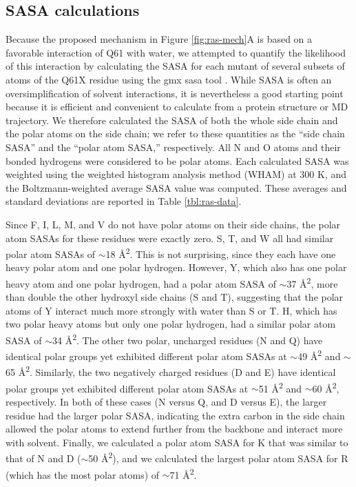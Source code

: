 \subsection{SASA calculations}

Because the proposed mechanism in Figure \ref{fig:ras-mech}A is based on a favorable interaction of Q61 with water, we attempted to quantify the likelihood of this interaction by calculating the SASA for each mutant of several subsets of atoms of the Q61X residue using the gmx sasa tool \cite{Eisenhaber1995}.
While SASA is often an oversimplification of solvent interactions, it is nevertheless a good starting point because it is efficient and convenient to calculate from a protein structure or MD trajectory. 
We therefore calculated the SASA of both the whole side chain and the polar atoms on the side chain; we refer to these quantities as the ``side chain SASA'' and the ``polar atom SASA,'' respectively. 
All N and O atoms and their bonded hydrogens were considered to be polar atoms. 
Each calculated SASA was weighted using the weighted histogram analysis method (WHAM) at 300 K, and the Boltzmann-weighted average SASA value was computed. 
These averages and standard deviations are reported in Table \ref{tbl:ras-data}.

Since F, I, L, M, and V do not have polar atoms on their side chains, the polar atom SASAs for these residues were exactly zero. 
S, T, and W all had similar polar atom SASAs of $\sim$18 \si{\angstrom^2}. 
This is not surprising, since they each have one heavy polar atom and one polar hydrogen. 
However, Y, which also has one polar heavy atom and one polar hydrogen, had a polar atom SASA of $\sim$37 \si{\angstrom^2}, more than double the other hydroxyl side chains (S and T), suggesting that the polar atoms of Y interact much more strongly with water than S or T. 
H, which has two polar heavy atoms but only one polar hydrogen, had a similar polar atom SASA of $\sim$34 \si{\angstrom^2}. 
The other two polar, uncharged residues (N and Q) have identical polar groups yet exhibited different polar atom SASAs at $\sim$49 \si{\angstrom^2} and $\sim$65 \si{\angstrom^2}. 
Similarly, the two negatively charged residues (D and E) have identical polar groups yet exhibited different polar atom SASAs at $\sim$51 \si{\angstrom^2} and $\sim$60 \si{\angstrom^2}, respectively. 
In both of these cases (N versus Q, and D versus E), the larger residue had the larger polar SASA, indicating the extra carbon in the side chain allowed the polar atoms to extend further from the backbone and interact more with solvent. 
Finally, we calculated a polar atom SASA for K that was similar to that of N and D ($\sim$50 \si{\angstrom^2}), and we calculated the largest polar atom SASA for R (which has the most polar atoms) of $\sim$71 \si{\angstrom^2}.

